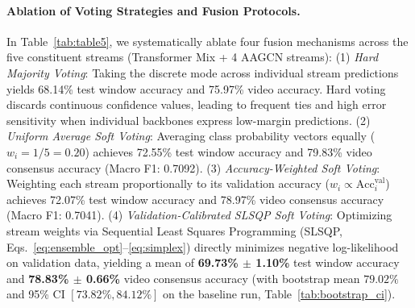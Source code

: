 \documentclass[runningheads]{llncs}
\begin{document}
\paragraph{Ablation of Voting Strategies and Fusion Protocols.} In Table~\ref{tab:table5}, we systematically ablate four fusion mechanisms across the five constituent streams (Transformer Mix + 4 AAGCN streams):
(1) \textit{Hard Majority Voting}: Taking the discrete mode across individual stream predictions yields 68.14\% test window accuracy and 75.97\% video accuracy. Hard voting discards continuous confidence values, leading to frequent ties and high error sensitivity when individual backbones express low-margin predictions.
(2) \textit{Uniform Average Soft Voting}: Averaging class probability vectors equally ($w_i = 1/5 = 0.20$) achieves 72.55\% test window accuracy and 79.83\% video consensus accuracy (Macro F1: 0.7092).
(3) \textit{Accuracy-Weighted Soft Voting}: Weighting each stream proportionally to its validation accuracy ($w_i \propto \text{Acc}_i^{\text{val}}$) achieves 72.07\% test window accuracy and 78.97\% video consensus accuracy (Macro F1: 0.7041).
(4) \textit{Validation-Calibrated SLSQP Soft Voting}: Optimizing stream weights via Sequential Least Squares Programming (SLSQP, Eqs.~\eqref{eq:ensemble_opt}--\eqref{eq:simplex}) directly minimizes negative log-likelihood on validation data, yielding a mean of \textbf{69.73\% $\pm$ 1.10\%} test window accuracy and \textbf{78.83\% $\pm$ 0.66\%} video consensus accuracy (with bootstrap mean $79.02\%$ and 95\% CI $[73.82\%, 84.12\%]$ on the baseline run, Table~\ref{tab:bootstrap_ci}).
\end{document}
